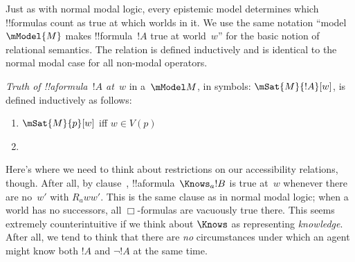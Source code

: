 \documentclass[../../../include/open-logic-section]{subfiles}
\begin{document}


Just as with normal modal logic, every epistemic model determines which !!{formula}s count as true at
which worlds in it. We use the same notation ``model $\mModel{M}$ makes
!!{formula}~$!A$ true at world~$w$'' for the basic notion of relational
semantics. The relation is defined inductively and is identical to the normal modal case for all non-modal operators.

\begin{defn}
  \emph{Truth of !!a{formula}~$!A$ at~$w$} in a~$\mModel M$, in symbols:
  $\mSat{M}{!A}[w]$, is defined inductively as follows:
  \begin{enumerate}
  \item $\mSat{M}{p}[w]$ iff $w \in V(p)$
  \item{}
  \end{enumerate} 
\end{defn}

Here's where we need to think about restrictions on our accessibility
relations, though. After all, by clause~,
!!a{formula}~$\Knows_a !B$ is true at~$w$ whenever there are no~$w'$
with $R_a ww'$. This is the same clause as in normal modal logic; when
a world has no successors, all $\Box$-formulas are vacuously true
there. This seems extremely counterintuitive if we think about
$\Knows$ as representing \emph{knowledge}. After all, we tend to think
that there are \emph{no} circumstances under which an agent might know
both $!A$ and $\lnot !A$ at the same time.
\end{document}
